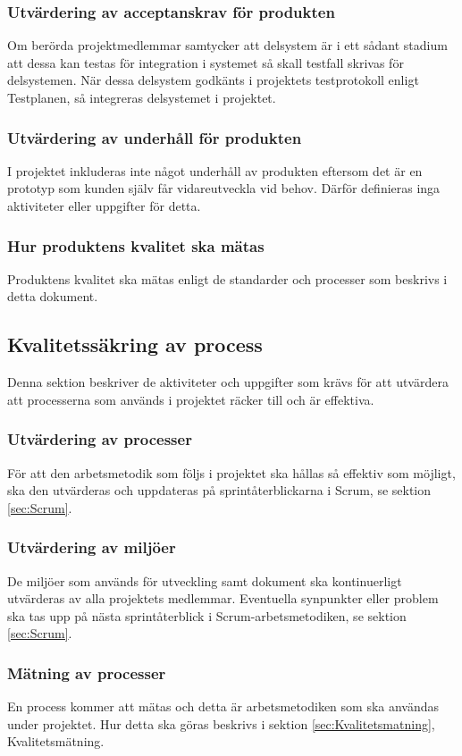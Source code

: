 \documentclass[a4paper,10pt]{article}
\begin{document}
\subsubsection{Utvärdering av acceptanskrav för produkten}
Om berörda projektmedlemmar samtycker att delsystem är i ett sådant stadium att dessa kan testas för integration i systemet så skall testfall skrivas för delsystemen. När dessa delsystem godkänts i projektets testprotokoll enligt Testplanen, så integreras delsystemet i projektet.
\subsubsection{Utvärdering av underhåll för produkten}
I projektet inkluderas inte något underhåll av produkten eftersom det är en prototyp som kunden själv får vidareutveckla vid behov. Därför definieras inga aktiviteter eller uppgifter för detta.
\subsubsection{Hur produktens kvalitet ska mätas}
Produktens kvalitet ska mätas enligt de standarder och processer som beskrivs i detta dokument.
\subsection{Kvalitetssäkring av process}
Denna sektion beskriver de aktiviteter och uppgifter som krävs för att utvärdera att processerna som används i projektet räcker till och är effektiva.

\subsubsection{Utvärdering av processer}
För att den arbetsmetodik som följs i projektet ska hållas så effektiv som möjligt, ska den utvärderas och uppdateras på sprintåterblickarna i Scrum, se sektion \ref{sec:Scrum}.

\subsubsection{Utvärdering av miljöer}
De miljöer som används för utveckling samt dokument ska kontinuerligt utvärderas av alla projektets medlemmar. Eventuella synpunkter eller problem ska tas upp på nästa sprintåterblick i Scrum-arbetsmetodiken, se sektion \ref{sec:Scrum}.

\subsubsection{Mätning av processer}
En process kommer att mätas och detta är arbetsmetodiken som ska användas under projektet. Hur detta ska göras beskrivs i sektion \ref{sec:Kvalitetsmatning}, Kvalitetsmätning.
\end{document}
